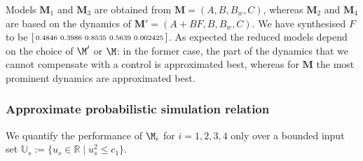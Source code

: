 \documentclass[letterpaper, 10 pt, conference]{amsart}
\theoremstyle{definition}
\theoremstyle{example}
\theoremstyle{remark}
\begin{document}
Models $\mathbf M_{1}$ and $\mathbf M_{3}$ are obtained from $\mathbf M=(A,B,B_w,C)$, 
whereas  $\mathbf M_{2}$ and $\mathbf M_{4}$ are based on the dynamics of $\mathbf M'=(A+BF,B,B_w,C)$. 
We have synthesised $F$ to be $\begin{bsmallmatrix} 0.4846 &  0.3986 &  0.8535 &  0.5639 &0.002425 \end{bsmallmatrix}$. 
As expected the reduced models depend on the choice of $\M'$ or $\M$: 
in the former case, the part of the dynamics that we cannot compensate with a control is approximated best,
whereas for $\mathbf M$ the most prominent dynamics are approximated best.


\subsubsection*{Approximate probabilistic simulation relation}
We quantify the performance of $\M_i$ for $i=1,2,3,4$ only over a bounded input set  $\mathbb U_s:= \{u_s\in \mathbb R\mid  u_s^2\leq c_1 \}$.
\end{document}

